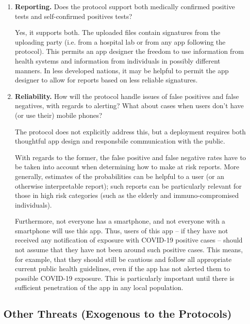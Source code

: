 \documentclass{article}
\begin{document}
\begin{enumerate}[leftmargin=*]

\item \textbf{Reporting.} Does the protocol support both medically confirmed positive tests and self-confirmed positives tests? 

Yes, it supports both. The uploaded files contain signatures from the uploading party (i.e. from a hospital lab or from any app following the protocol). This permits an app designer the freedom to use information from health systems and information from individuals in possibly different manners. In less developed nations, it may be helpful to permit the app designer to allow for reports based on less reliable signatures. 

\item \textbf{Reliability.} How will the protocol handle issues of false positives and false negatives, with regards to alerting? What about cases when users don't have (or use their) mobile phones?

The protocol does not explicitly address this, but a deployment requires both thoughtful app design and responsbile communication with the public.

With regards to the former, the false positive and false negative rates have to be taken into account when determining how to make at risk reports. More generally, estimates of the probabilities can be helpful to a user (or an otherwise interpretable report); such reports can be particularly relevant for those in high risk categories (such as the elderly and immuno-compromised individuals).  %

Furthermore, not everyone has a smartphone,  and not everyone with a smartphone will use this app. Thus, users of this app -- if they have not received any notification of exposure with COVID-19 positive cases -- should not assume that they have not been around such positive cases. This means, for example, that they should still be cautious and follow all appropriate current public health guidelines, even if the app has not alerted them to possible COVID-19 exposure. This is particularly important until there is sufficient penetration of the app in any local population.


\end{enumerate}


\subsection{Other Threats (Exogenous to the Protocols)}
\end{document}
